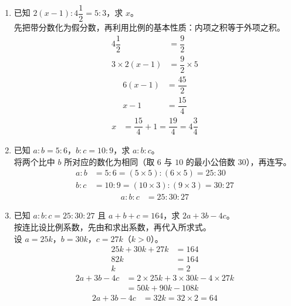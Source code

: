 \documentclass[12pt,a4paper,fontset=none]{exam-zh}
\begin{document}
\begin{solution}
    \begin{enumerate}[label=(\alph*)]
        \item 已知 $2(x-1):4\dfrac{1}{2} = 5:3$，求 $x$。 \\
        先把带分数化为假分数，再利用比例的基本性质：内项之积等于外项之积。 \\
        \begin{align*}
            4\dfrac{1}{2} &= \dfrac{9}{2} \\
            3\times 2(x-1) &= \dfrac{9}{2} \times 5
        \end{align*}
        \begin{align*}
            6(x-1) &= \dfrac{45}{2} \\
            x-1 &= \dfrac{15}{4}
        \end{align*}
        \begin{align*}
            x &= \dfrac{15}{4} + 1 = \dfrac{19}{4} = 4\dfrac{3}{4}
        \end{align*}

        \item 已知 $a:b = 5:6$，$b:c = 10:9$，求 $a:b:c$。 \\
        将两个比中 $b$ 所对应的数化为相同（取 $6$ 与 $10$ 的最小公倍数 $30$），再连写。 \\
        \begin{align*}
            a:b &= 5:6 = (5\times5):(6\times5) = 25:30 \\
            b:c &= 10:9 = (10\times3):(9\times3) = 30:27
        \end{align*}
        \begin{align*}
            a:b:c &= 25:30:27
        \end{align*}

        \item 已知 $a:b:c = 25:30:27$ 且 $a+b+c=164$，求 $2a+3b-4c$。 \\
        按连比设比例系数，先由和求出系数，再代入所求式。 \\
        设 $a = 25k$，$b = 30k$，$c = 27k$（$k>0$）。 \\
        \begin{align*}
            25k + 30k + 27k &= 164 \\
            82k &= 164 \\
            k &= 2
        \end{align*}
        \begin{align*}
            2a+3b-4c &= 2\times25k + 3\times30k - 4\times27k \\
            &= 50k + 90k - 108k
        \end{align*}
        \begin{align*}
            2a+3b-4c &= 32k = 32\times2 = 64
        \end{align*}
    \end{enumerate}
\end{solution}
\end{document}
